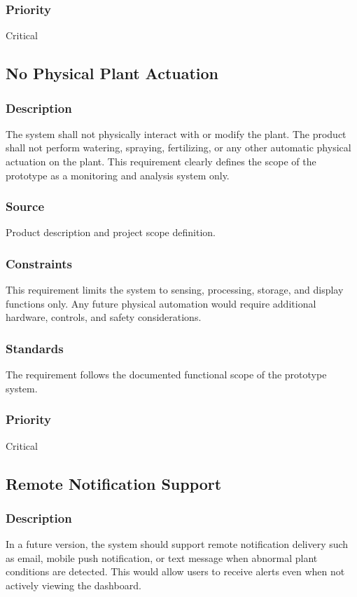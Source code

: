 \subsubsection{Priority}
Critical

\subsection{No Physical Plant Actuation}
\subsubsection{Description}
The system shall not physically interact with or modify the plant. The product shall not perform watering, spraying, fertilizing, or any other automatic physical actuation on the plant. This requirement clearly defines the scope of the prototype as a monitoring and analysis system only.

\subsubsection{Source}
Product description and project scope definition.

\subsubsection{Constraints}
This requirement limits the system to sensing, processing, storage, and display functions only. Any future physical automation would require additional hardware, controls, and safety considerations.

\subsubsection{Standards}
The requirement follows the documented functional scope of the prototype system.

\subsubsection{Priority}
Critical

\subsection{Remote Notification Support}
\subsubsection{Description}
In a future version, the system should support remote notification delivery such as email, mobile push notification, or text message when abnormal plant conditions are detected. This would allow users to receive alerts even when not actively viewing the dashboard.


